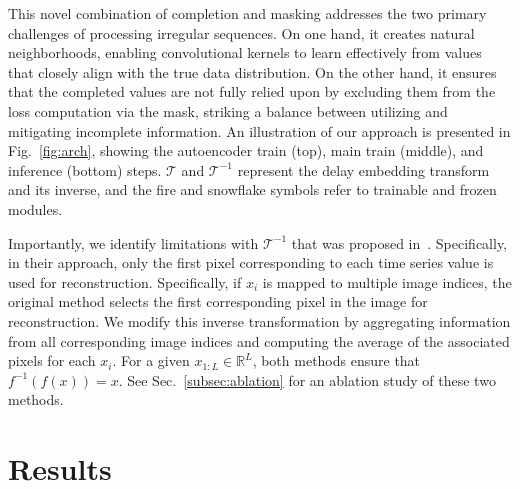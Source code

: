 \documentclass{article}
\theoremstyle{plain}
\theoremstyle{definition}
\theoremstyle{remark}
\begin{document}
This novel combination of completion and masking addresses the two primary challenges of processing irregular sequences. On one hand, it creates natural neighborhoods, enabling convolutional kernels to learn effectively from values that closely align with the true data distribution. On the other hand, it ensures that the completed values are not fully relied upon by excluding them from the loss computation via the mask, striking a balance between utilizing and mitigating incomplete information. An illustration of our approach is presented in Fig.~\ref{fig:arch}, showing the autoencoder train (top), main train (middle), and inference (bottom) steps. $\mathcal{T}$ and $\mathcal{T}^{-1}$ represent the delay embedding transform and its inverse, and the fire and snowflake symbols refer to trainable and frozen modules.

Importantly, we identify limitations with $\mathcal{T}^{-1}$ that was proposed in~\cite{naiman2024utilizing}. Specifically, in their approach, only the first pixel corresponding to each time series value is used for reconstruction. Specifically, if $x_i$ is mapped to multiple image indices, the original method selects the first corresponding pixel in the image for reconstruction. We modify this inverse transformation by aggregating information from all corresponding image indices and computing the average of the associated pixels for each \( x_i \). For a given \( x_{1:L} \in \mathbb{R}^L \), both methods ensure that \( f^{-1}(f(x)) = x \). See Sec.~\ref{subsec:ablation} for an ablation study of these two methods.



\vspace{-3mm}
\section{Results}
\label{sec:results}
\vspace{-2mm}
\end{document}
